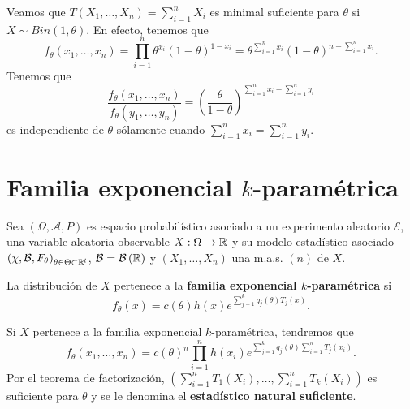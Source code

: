 \begin{eg}
Veamos que $\displaystyle T\left(X_{1}, \ldots, X_{n}\right)=\sum^{n}_{i=1}X_{i} $ es minimal suficiente para $\displaystyle \theta $ si $\displaystyle X \sim Bin\left(1,\theta\right) $. En efecto, tenemos que 
\[f_{\theta}\left(x_{1}, \ldots, x_{n}\right)=\prod^{n}_{i=1}\theta^{x_{i}}\left(1-\theta\right)^{1-x_{i}}=\theta^{\sum^{n}_{i=1}x_{i}}\left(1-\theta\right)^{n-\sum^{n}_{i=1}x_{i}} .\]
Tenemos que 
\[\frac{f_{\theta}\left(x_{1}, \ldots, x_{n}\right)}{f_{\theta}\left(y_{1}, \ldots, y_{n}\right)}=\left(\frac{\theta}{1-\theta}\right)^{\sum^{n}_{i=1}x_{i}-\sum^{n}_{i=1}y_{i}} \]
es independiente de $\displaystyle \theta $ sólamente cuando $\displaystyle \sum^{n}_{i=1}x_{i}=\sum^{n}_{i=1}y_{i} $. 
\end{eg}
\section{Familia exponencial $\displaystyle k $-paramétrica}
Sea $\displaystyle \left(\Omega, \mathcal{A}, P\right) $ es espacio probabilístico asociado a un experimento aleatorio $\displaystyle \mathcal{E} $, una variable aleatoria observable $\displaystyle X : \Omega \to \mathbb{R} $ y su modelo estadístico asociado $\displaystyle \left(\chi, \mathcal{B}, F_{\theta}\right)_{\theta\in \Theta \subset \mathbb{R}^{l}} $, $\displaystyle \mathcal{B}=\mathcal{B}\left(\mathbb{R}\right) $ y $\displaystyle \left(X_{1}, \ldots, X_{n}\right) $ una m.a.s. $\displaystyle \left(n\right) $ de $\displaystyle X $. 
\begin{definition}
La distribución de $\displaystyle X $ pertenece a la \textbf{familia exponencial $\displaystyle k $-paramétrica} si 
\[f_{\theta}\left(x\right)=c\left(\theta\right)h\left(x\right)e^{\sum^{k}_{j=1}q_{j}\left(\theta\right)T_{j}\left(x\right)} .\]
\end{definition}
\begin{observation}
Si $\displaystyle X $ pertenece a la familia exponencial $\displaystyle k $-paramétrica, tendremos que 
\[f_{\theta}\left(x_{1}, \ldots, x_{n}\right)=c\left(\theta\right)^{n}\prod^{n}_{i=1}h\left(x_{i}\right)e^{\sum^{k}_{j = 1}q_{j}\left(\theta\right)\sum^{n}_{i=1}T_{j}\left(x_{i}\right)} .\]
Por el teorema de factorización, $\displaystyle \left(\sum^{n}_{i=1}T_{1}\left(X_{i}\right), \ldots, \sum^{n}_{i=1}T_{k}\left(X_{i}\right)\right) $ es suficiente para $\displaystyle \theta $ y se le denomina el \textbf{estadístico natural suficiente}. 
\end{observation}
